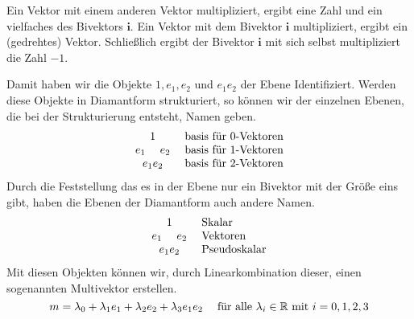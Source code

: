 \documentclass[fleqn]{scrartcl}
\numberwithin{equation}{section}
\def\*#1{\mathbf{#1}}
\begin{document}
Ein Vektor mit einem anderen Vektor multipliziert, ergibt eine Zahl und ein
vielfaches des Bivektors $\*i$. Ein Vektor mit dem Bivektor $\*i$
multipliziert, ergibt ein (gedrehtes) Vektor. Schließlich ergibt der Bivektor
$\*i$ mit sich selbst multipliziert die Zahl $-1$.

Damit haben wir die Objekte $1, e_1, e_2$ und $e_1e_2$ der Ebene
Identifiziert. Werden diese Objekte in Diamantform strukturiert, so können
wir der einzelnen Ebenen, die bei der Strukturierung entsteht, Namen geben.
\[
\begin{matrix}
    1 \\ 
    e_1\hspace{3ex} e_2 \\ 
    e_1e_2
\end{matrix}
\hspace{3ex}
\begin{matrix*}[l]
    \textrm{basis für }0\textrm{-Vektoren} \\ 
    \textrm{basis für }1\textrm{-Vektoren} \\ 
    \textrm{basis für }2\textrm{-Vektoren}
\end{matrix*}
\]
Durch die Feststellung das es in der Ebene nur ein Bivektor mit der Größe eins
gibt, haben die Ebenen der Diamantform auch andere Namen.
\[
\begin{matrix}
    1 \\ 
    e_1\hspace{3ex} e_2 \\ 
    e_1e_2
\end{matrix}
\hspace{3ex}
\begin{matrix*}[l]
    \textrm{Skalar} \\ 
    \textrm{Vektoren} \\ 
    \textrm{Pseudoskalar}
\end{matrix*}
\]
Mit diesen Objekten können wir, durch Linearkombination dieser, einen sogenannten
Multivektor erstellen.
\[
    m = \lambda_0 + \lambda_1e_1 + \lambda_2e_2 +
    \lambda_3e_1e_2\hspace{3ex}\textrm{für alle
    }\lambda_i\in\mathbb{R}\textrm{ mit } i=0,1,2,3
\]
\end{document}
